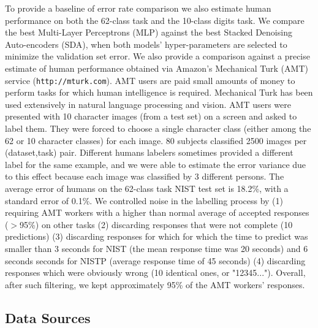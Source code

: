 \documentclass{article} %
\begin{document}
To provide a baseline of error rate comparison we also estimate human performance
on both the 62-class task and the 10-class digits task.
We compare the best Multi-Layer Perceptrons (MLP) against
the best Stacked Denoising Auto-encoders (SDA), when
both models' hyper-parameters are selected to minimize the validation set error.
We also provide a comparison against a precise estimate
of human performance obtained via Amazon's Mechanical Turk (AMT)
service ({\tt http://mturk.com}). 
AMT users are paid small amounts
of money to perform tasks for which human intelligence is required.
Mechanical Turk has been used extensively in natural language processing and vision.
AMT users were presented
with 10 character images (from a test set) on a screen
and asked to label them.
They were forced to choose a single character class (either among the
62 or 10 character classes) for each image.
80 subjects classified 2500 images per (dataset,task) pair.
Different humans labelers sometimes provided a different label for the same
example, and we were able to estimate the error variance due to this effect
because each image was classified by 3 different persons. 
The average error of humans on the 62-class task NIST test set
is 18.2\%, with a standard error of 0.1\%.
We controlled noise in the labelling process by (1)
requiring AMT workers with a higher than normal average of accepted
responses ($>$95\%) on other tasks (2) discarding responses that were not
complete (10 predictions) (3) discarding responses for which for which the
time to predict was smaller than 3 seconds for NIST (the mean response time
was 20 seconds) and 6 seconds seconds for NISTP (average response time of
45 seconds) (4) discarding responses which were obviously wrong (10
identical ones, or "12345..."). Overall, after such filtering, we kept
approximately 95\% of the AMT workers' responses.

\subsection{Data Sources}
\label{sec:sources}
\end{document}
